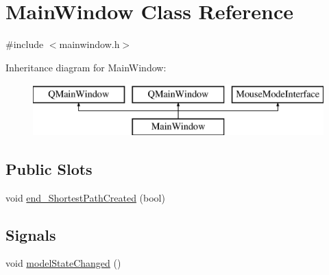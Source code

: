 \hypertarget{class_main_window}{}\section{Main\+Window Class Reference}
\label{class_main_window}


{\ttfamily \#include $<$mainwindow.\+h$>$}

Inheritance diagram for Main\+Window\+:\begin{figure}[H]
\begin{center}
\leavevmode
\includegraphics[height=2.000000cm]{d9/dc6/class_main_window}
\end{center}
\end{figure}
\subsection*{Public Slots}
\begin{DoxyCompactItemize}
\item 
void \mbox{\hyperlink{class_main_window_ac86429fa77357e6385f0e6c1e1601c3f}{end\+\_\+\+Shortest\+Path\+Created}} (bool)
\end{DoxyCompactItemize}
\subsection*{Signals}
\begin{DoxyCompactItemize}
\item 
void \mbox{\hyperlink{class_main_window_ad8870f878f5ba77bc4506e453ae32b93}{model\+State\+Changed}} ()
\end{DoxyCompactItemize}
